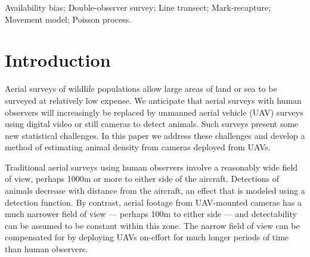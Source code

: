 \documentclass[useAMS, usenatbib, referee]{biom}\usepackage[]{graphicx}\usepackage[]{color}
\begin{document}
\begin{keywords}
Availability bias; Double-observer survey; Line transect; Mark-recapture; Movement model; Poisson process.
\end{keywords}



\maketitle

\section{Introduction}\label{sec:intro}


  Aerial surveys of wildlife populations allow large areas of land or sea to be surveyed at relatively low expense. We anticipate that aerial surveys with human observers will increasingly be replaced by unmanned aerial vehicle (UAV) surveys using digital video or still cameras to detect animals. Such surveys present some new statistical challenges. In this paper we address these challenges and develop a method of estimating animal density from cameras deployed from UAVs.

Traditional aerial surveys using human observers involve a reasonably wide field of view, perhaps 1000m or more to either side of the aircraft. Detections of animals decrease with distance from the aircraft, an effect that is modeled using a detection function. By contrast, aerial footage from UAV-mounted cameras has a much narrower field of view --- perhaps 100m to either side --- and detectability can be assumed to be constant within this zone. The narrow field of view can be compensated for by deploying UAVs on-effort for much longer periods of time than human observers.
\end{document}

